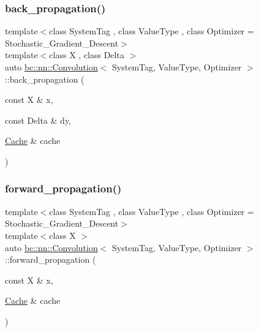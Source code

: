 \subsubsection{\texorpdfstring{back\+\_\+propagation()}{back\_propagation()}}
{\footnotesize\ttfamily template$<$class System\+Tag , class Value\+Type , class Optimizer  = Stochastic\+\_\+\+Gradient\+\_\+\+Descent$>$ \\
template$<$class X , class Delta $>$ \\
auto \hyperlink{structbc_1_1nn_1_1Convolution}{bc\+::nn\+::\+Convolution}$<$ System\+Tag, Value\+Type, Optimizer $>$\+::back\+\_\+propagation (\begin{DoxyParamCaption}\item[{const X \&}]{x,  }\item[{const Delta \&}]{dy,  }\item[{\hyperlink{structbc_1_1nn_1_1Cache}{Cache} \&}]{cache }\end{DoxyParamCaption})\hspace{0.3cm}{\ttfamily [inline]}}

\mbox{\label{structbc_1_1nn_1_1Convolution_a99ff4923bc1f445a1497bfb11914930f}} 
\subsubsection{\texorpdfstring{forward\+\_\+propagation()}{forward\_propagation()}}
{\footnotesize\ttfamily template$<$class System\+Tag , class Value\+Type , class Optimizer  = Stochastic\+\_\+\+Gradient\+\_\+\+Descent$>$ \\
template$<$class X $>$ \\
auto \hyperlink{structbc_1_1nn_1_1Convolution}{bc\+::nn\+::\+Convolution}$<$ System\+Tag, Value\+Type, Optimizer $>$\+::forward\+\_\+propagation (\begin{DoxyParamCaption}\item[{const X \&}]{x,  }\item[{\hyperlink{structbc_1_1nn_1_1Cache}{Cache} \&}]{cache }\end{DoxyParamCaption})\hspace{0.3cm}{\ttfamily [inline]}}

\mbox{\label{structbc_1_1nn_1_1Convolution_a2ea23e12ab647c85966cb8f86f85e8bf}} 
